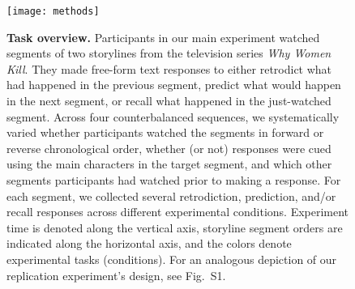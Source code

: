 \documentclass[10pt]{article}
\newcommand{\MethodsReplExp}{S1}
\begin{document}
\begin{figure}[tp]
  \centering
  \texttt{[image: methods]}

  \caption{\textbf{Task overview.} Participants in our main experiment watched segments of two storylines from the television series \textit{Why Women Kill}. They made free-form text responses to either retrodict what had happened in the previous segment, predict what would happen in the next segment, or recall what happened in the just-watched segment. Across four counterbalanced sequences, we systematically varied whether participants watched the segments in forward or reverse chronological order, whether (or not) responses were cued using the main characters in the target segment, and which other segments participants had watched prior to making a response. For each segment, we collected several retrodiction, prediction, and/or recall responses across different experimental conditions. Experiment time is denoted along the vertical axis, storyline segment orders are indicated along the horizontal axis, and the colors denote experimental tasks (conditions). For an analogous depiction of our replication experiment's design, see Fig.~\MethodsReplExp.}

  \label{fig:method}
\end{figure}
\end{document}
